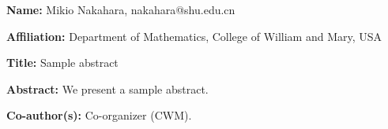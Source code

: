 \documentclass[11pt]{article}
\begin{document}
\medskip\noindent
{\bf Name:} Mikio Nakahara, nakahara@shu.edu.cn

\medskip\noindent
{\bf Affiliation:} Department of Mathematics, College of William and Mary, USA

\medskip\noindent
{\bf Title:} Sample abstract

\medskip\noindent
{\bf Abstract:} We present a sample abstract.

\medskip\noindent
{\bf Co-author(s):} Co-organizer (CWM).
\end{document}
